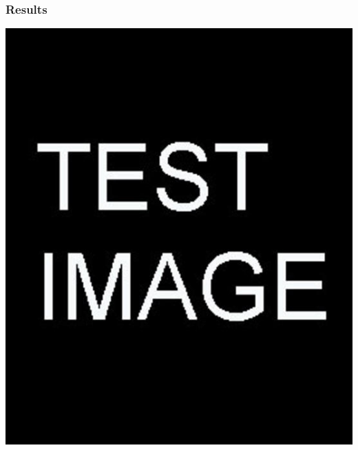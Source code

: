\documentclass{beamer}
\begin{document}
\begin{frame} %
	\frametitle{Results}
	\includegraphics[scale=0.2]{etc/test.jpg}
\end{frame}
\end{document}
